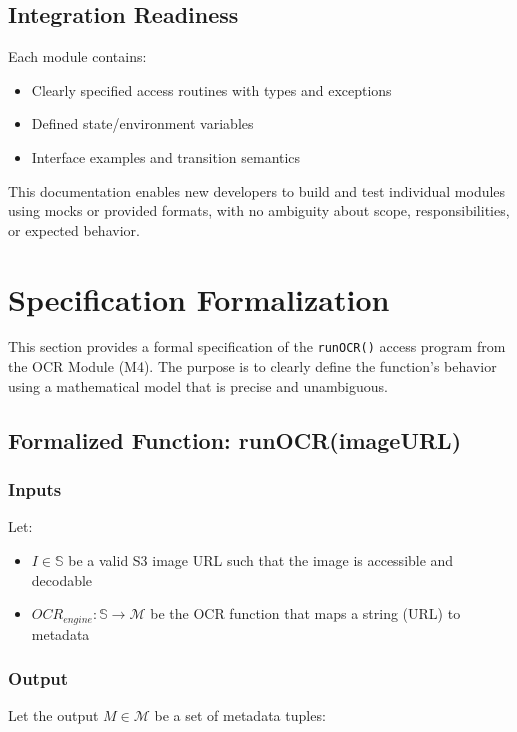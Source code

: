 \documentclass[12pt, titlepage]{article}
\begin{document}
\subsection*{Integration Readiness}
Each module contains:
\begin{itemize}
  \item Clearly specified access routines with types and exceptions
  \item Defined state/environment variables
  \item Interface examples and transition semantics
\end{itemize}

This documentation enables new developers to build and test individual modules using mocks or provided formats, with no ambiguity about scope, responsibilities, or expected behavior.

\section{Specification Formalization}
\label{SecFormal}

This section provides a formal specification of the \texttt{runOCR()} access program from the OCR Module (M4). The purpose is to clearly define the function’s behavior using a mathematical model that is precise and unambiguous.

\subsection*{Formalized Function: runOCR(imageURL)}

\subsubsection*{Inputs}
Let:

\begin{itemize}
  \item $I \in \mathbb{S}$ be a valid S3 image URL such that the image is accessible and decodable
  \item $OCR_{engine}: \mathbb{S} \rightarrow \mathcal{M}$ be the OCR function that maps a string (URL) to metadata
\end{itemize}

\subsubsection*{Output}
Let the output $M \in \mathcal{M}$ be a set of metadata tuples:
\end{document}

